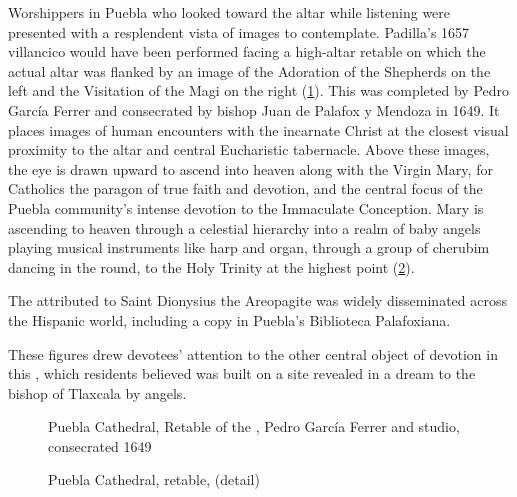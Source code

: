 Worshippers in Puebla who looked toward the altar while listening were presented
with a resplendent vista of images to contemplate.
Padilla's 1657 villancico would have been performed facing a high-altar retable
on which the actual altar was flanked by an image of the Adoration of the
Shepherds on the left and the Visitation of the Magi on the right
(\cref{fig:Puebla-Ferrer-Retablo}).
This  was completed by Pedro García Ferrer and
consecrated by bishop Juan de Palafox y Mendoza in 1649.
It places images of human encounters with the incarnate Christ at the closest
visual proximity to the altar and central Eucharistic tabernacle.%
    \Autocite{Gali:GarciaFerrer}
Above these images, the eye is drawn upward to ascend into heaven along with the
Virgin Mary, for Catholics the paragon of true faith and devotion, and the
central focus of the Puebla community's intense devotion to the Immaculate
Conception.
Mary is ascending to heaven through a celestial hierarchy  into a realm of baby
angels playing musical instruments like harp and organ, through a group of
cherubim dancing in the round, to the Holy Trinity at the highest point
(\cref{fig:Puebla-Ferrer-BMV}).%
\begin{Footnote}
    The  attributed to Saint Dionysius the
    Areopagite was widely disseminated across the Hispanic world, including a
    copy in Puebla's Biblioteca Palafoxiana.
\end{Footnote}
These figures drew devotees' attention to the other central object of devotion
in this , which residents believed was built on a
site revealed in a dream to the bishop of Tlaxcala by angels.%
    \Autocites
    [67--68]{Lomeli:Puebla}
    [21]{AngelContreras:Puebla}

\begin{figure}
    \caption{Puebla Cathedral, Retable of the , Pedro
    García Ferrer and studio, consecrated 1649}
  
    \label{fig:Puebla-Ferrer-Retablo}
\end{figure}

\begin{figure}
    \caption{Puebla Cathedral, retable, 
    (detail)} 
  
    \label{fig:Puebla-Ferrer-BMV}
\end{figure}

